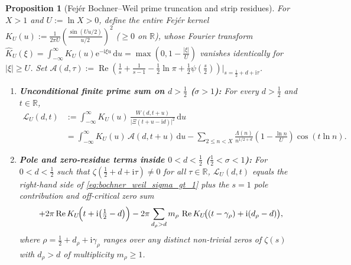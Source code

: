 \documentclass[11pt,reqno]{amsart}
\newtheorem{proposition}[theorem]{Proposition}
\theoremstyle{definition}
\theoremstyle{remark}
\numberwithin{equation}{section}
\newcommand{\ii}{\mathrm{i}}
\newcommand{\ee}{\mathrm{e}}
\newcommand{\dd}{\mathrm{d}}
\newcommand{\Rea}{\operatorname{Re}}
\begin{document}
\begin{proposition}[Fej\'er Bochner--Weil prime truncation and strip residues]\label{prop:bochner_weil}
For $X > 1$ and $U := \ln X > 0$, define the entire Fej\'er kernel $K_U(u) := \frac{1}{2\pi U}(\frac{\sin(Uu/2)}{u/2})^2$ ($\ge 0$ on $\mathbb{R}$), whose Fourier transform $\widehat{K}_U(\xi) = \int_{-\infty}^\infty K_U(u)\ee^{-\ii\xi u}\,\dd u = \max(0, 1 - \frac{\lvert\xi\rvert}{U})$ vanishes identically for $\lvert\xi\rvert \ge U$. Set $\mathcal{A}(d,\tau) := \Rea(\frac{1}{s} + \frac{1}{s-1} - \frac{1}{2}\ln\pi + \frac{1}{2}\psi(\frac{s}{2}))|_{s = \frac{1}{2}+d+\ii\tau}$.
\begin{enumerate}[label=\textup{(\arabic*)},leftmargin=2.2em]
  \item \textbf{Unconditional finite prime sum on $d > \frac{1}{2}$ ($\sigma > 1$):} For every $d > \frac{1}{2}$ and $t \in \mathbb{R}$,
  \begin{equation}\label{eq:bochner_weil_sigma_gt_1}
    \begin{aligned}
      \mathcal{L}_U(d,t) &:= \int_{-\infty}^{\infty} K_U(u)\,\frac{W(d,t+u)}{\lvert\Xi(t+u-\ii d)\rvert^2}\,\dd u \\
      &= \int_{-\infty}^{\infty} K_U(u)\,\mathcal{A}(d,t+u)\,\dd u
         - \sum_{2 \le n < X}\frac{\Lambda(n)}{n^{1/2+d}}\left(1 - \frac{\ln n}{U}\right)\cos(t\ln n).
    \end{aligned}
  \end{equation}
  \item \textbf{Pole and zero-residue terms inside $0 < d < \frac{1}{2}$ ($\frac{1}{2} < \sigma < 1$):} For $0 < d < \frac{1}{2}$ such that $\zeta(\frac{1}{2}+d+\ii\tau) \neq 0$ for all $\tau \in \mathbb{R}$, $\mathcal{L}_U(d,t)$ equals the right-hand side of \eqref{eq:bochner_weil_sigma_gt_1} \emph{plus} the $s = 1$ pole contribution and off-critical zero sum
  \begin{equation}\label{eq:bochner_weil_strip_residues}
    +2\pi\Rea K_U\!\Bigl(t + \ii\bigl(\tfrac{1}{2}-d\bigr)\Bigr)
    - 2\pi\sum_{d_\rho > d} m_\rho\,\Rea K_U\!\bigl((t - \gamma_\rho) + \ii(d_\rho - d)\bigr),
  \end{equation}
  where $\rho = \frac{1}{2} + d_\rho + \ii\gamma_\rho$ ranges over any distinct non-trivial zeros of $\zeta(s)$ with $d_\rho > d$ of multiplicity $m_\rho \ge 1$.
\end{enumerate}
\end{proposition}
\end{document}

